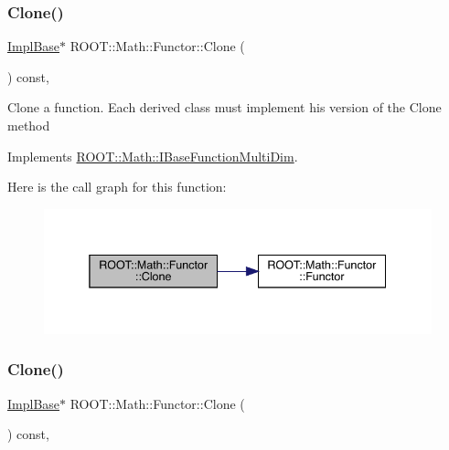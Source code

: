 \subsubsection{\texorpdfstring{Clone()}{Clone()}\hspace{0.1cm}{\footnotesize\ttfamily [1/3]}}
{\footnotesize\ttfamily \mbox{\hyperlink{classROOT_1_1Math_1_1Functor_acc5dacb213f26296122e95138f5153b3}{Impl\+Base}}$\ast$ R\+O\+O\+T\+::\+Math\+::\+Functor\+::\+Clone (\begin{DoxyParamCaption}{ }\end{DoxyParamCaption}) const\hspace{0.3cm}{\ttfamily [inline]}, {\ttfamily [virtual]}}

Clone a function. Each derived class must implement his version of the Clone method 

Implements \mbox{\hyperlink{classROOT_1_1Math_1_1IBaseFunctionMultiDim_a57939204b1f525b43835b42e0635dd3b}{R\+O\+O\+T\+::\+Math\+::\+I\+Base\+Function\+Multi\+Dim}}.

Here is the call graph for this function\+:
\nopagebreak
\begin{figure}[H]
\begin{center}
\leavevmode
\includegraphics[width=338pt]{da/d8e/classROOT_1_1Math_1_1Functor_a989f9b6dd160ebe03911cdee00dacaad_cgraph}
\end{center}
\end{figure}
\mbox{\label{classROOT_1_1Math_1_1Functor_a989f9b6dd160ebe03911cdee00dacaad}} 
\subsubsection{\texorpdfstring{Clone()}{Clone()}\hspace{0.1cm}{\footnotesize\ttfamily [2/3]}}
{\footnotesize\ttfamily \mbox{\hyperlink{classROOT_1_1Math_1_1Functor_acc5dacb213f26296122e95138f5153b3}{Impl\+Base}}$\ast$ R\+O\+O\+T\+::\+Math\+::\+Functor\+::\+Clone (\begin{DoxyParamCaption}{ }\end{DoxyParamCaption}) const\hspace{0.3cm}{\ttfamily [inline]}, {\ttfamily [virtual]}}

